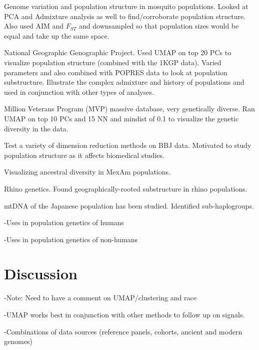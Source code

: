 \documentclass[12pt]{article}
\begin{document}
Genome variation and population structure in mosquito populations. Looked at PCA and Admixture analysis as well to find/corroborate population structure. Also used AIM and $F_{ST}$ and downsampled so that population sizes would be equal and take up the same space.\cite{consortium_genome_2020}

National Geographic Genographic
Project. Used UMAP on top 20 PCs to visualize population structure (combined with the 1KGP data). Varied parameters and also combined with POPRES data to look at population substructure. Illustrate the complex admixture and history of populations and used in conjunction with other types of analyses.\cite{zhang_generalized_2020}

Million Veterans Program (MVP) massive database, very genetically diverse. Ran UMAP on top 10 PCs and 15 NN  and mindist of 0.1 to visualize the genetic diversity in the data. \cite{hunter-zinck_genotyping_2020}

Test a variety of dimension reduction methods on BBJ data. Motivated to study population structure as it affects biomedical studies.\cite{sakaue_dimensionality_2020}

Visualizing ancestral diversity in MexAm populations.\cite{spear2020recent}

Rhino genetics. Found geographically-rooted substructure in rhino populations.\cite{sanchez-barreiro_historical_2020}

mtDNA of the Japanese population has been studied. Identified sub-haplogroups.\cite{yamamoto_genetic_2020}

-Uses in population genetics of humans

-Uses in population genetics of non-humans

\section*{Discussion}

-Note: Need to have a comment on UMAP/clustering and race

-UMAP works best in conjunction with other methods to follow up on signals.

-Combinations of data sources (reference panels, cohorts, ancient and modern genomes)


\end{document}
